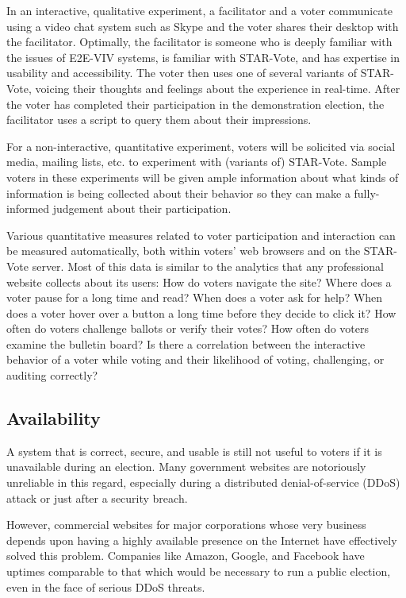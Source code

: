 In an interactive, qualitative experiment, a facilitator and a voter
communicate using a video chat system such as Skype and the voter
shares their desktop with the facilitator. Optimally, the facilitator
is someone who is deeply familiar with the issues of E2E-VIV systems,
is familiar with STAR-Vote, and has expertise in usability and
accessibility. The voter then uses one of several variants of
STAR-Vote, voicing their thoughts and feelings about the experience
in real-time. After the voter has completed their participation in the
demonstration election, the facilitator uses a script to query them
about their impressions.

For a non-interactive, quantitative experiment, voters will be
solicited via social media, mailing lists, etc. to experiment with
(variants of) STAR-Vote. Sample voters in these experiments will be
given ample information about what kinds of information is being
collected about their behavior so they can make a fully-informed
judgement about their participation.

Various quantitative measures related to voter participation and
interaction can be measured automatically, both within voters' web
browsers and on the STAR-Vote server. Most of this data is similar to
the analytics that any professional website collects about its users:
How do voters navigate the site?  Where does a voter pause for a long
time and read?  When does a voter ask for help?  When does a voter
hover over a button a long time before they decide to click it?  How
often do voters challenge ballots or verify their votes?  How often do
voters examine the bulletin board?  Is there a correlation between the
interactive behavior of a voter while voting and their likelihood of
voting, challenging, or auditing correctly?

\subsection{Availability}

A system that is correct, secure, and usable is still not useful to
voters if it is unavailable during an election. Many government
websites are notoriously unreliable in this regard, especially
during a distributed denial-of-service (DDoS) attack or just after a
security breach.

However, commercial websites for major corporations whose very
business depends upon having a highly available presence on the
Internet have effectively solved this problem. Companies like Amazon,
Google, and Facebook have uptimes comparable to that which would be
necessary to run a public election, even in the face of serious DDoS
threats.

